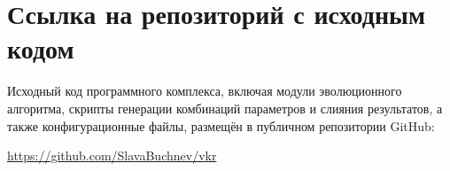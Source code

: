 \documentclass[732]{studrep}
\theoremstyle{nonumberplain}
\begin{document}
\chapter{Ссылка на репозиторий с исходным кодом}
Исходный код программного комплекса, включая модули эволюционного алгоритма,
скрипты генерации комбинаций параметров и слияния результатов,
а также конфигурационные файлы, размещён в публичном репозитории GitHub:
\begin{center}
\url{https://github.com/SlavaBuchnev/vkr}
\end{center}
\end{document}
